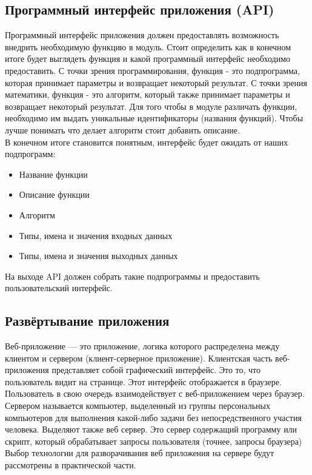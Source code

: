 \documentclass[14pt,a4paper]{scrartcl}
\begin{document}
    \subsection[Программный интерфейс приложения]{Программный интерфейс приложения (API)}
    Программный интерфейс приложения должен предоставлять возможность внедрить необходимую функцию в модуль.
    Стоит определить как в конечном итоге будет выглядеть функция и какой программный интерфейс необходимо предоставить.
    С точки зрения программирования, функция - это подпрограмма, которая принимает параметры и возвращает некоторый результат.
    С точки зрения математики, функция - это алгоритм, который также принимает параметры и возвращает некоторый результат.
    Для того чтобы в модуле различать функции, необходимо им выдать уникальные идентификаторы (названия функций).
    Чтобы лучше понимать что делает алгоритм стоит добавить описание.\\
    В конечном итоге становится понятным, интерфейс будет ожидать от наших подпрограмм:
    \begin{itemize}
        \item Название функции
        \item Описание функции
        \item Алгоритм
        \item Типы, имена и значения входных данных
        \item Типы, имена и значения выходных данных
    \end{itemize}
    На выходе API должен собрать такие подпрограммы и предоставить пользовательский интерфейс.

    \subsection[Развёртывание приложения]{Развёртывание приложения}
    Веб-приложение — это приложение, логика которого распределена между клиентом и сервером (клиент-серверное приложение)\cite{Web-app-wiki}.
    Клиентская часть веб-приложения представляет собой графический интерфейс.
    Это то, что пользователь видит на странице.
    Этот интерфейс отображается в браузере.
    Пользователь в свою очередь взаимодействует с веб-приложением через браузер.
    Сервером называется компьютер, выделенный из группы персональных компьютеров для выполнения какой-либо задачи без непосредственного участия человека.\cite{Server}
    Выделяют также веб сервер. Это сервер содержащий программу или скрипт, который обрабатывает запросы пользователя (точнее, запросы браузера)\cite{Web-app-struct}\\
    Выбор технологии для разворачивания веб приложения на сервере будут рассмотрены в практической части.
\end{document}
